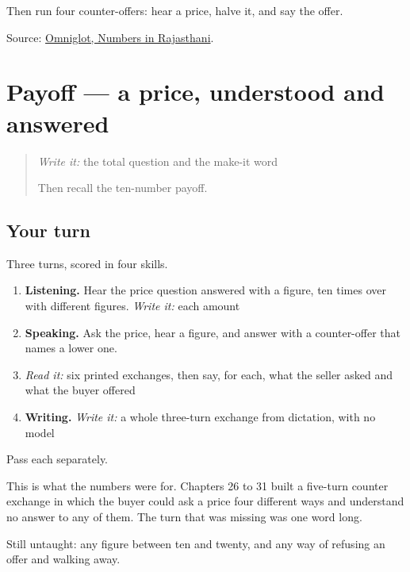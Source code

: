 Then run four counter-offers: hear a price, halve it, and say the offer.

\begin{tcolorbox}[breakable,colback=teal!4,colframe=teal!35!black,title={Before you move on}]
Source: \href{https://www.omniglot.com/language/numbers/rajasthani.htm}{Omniglot, Numbers in Rajasthani}.
\end{tcolorbox}
\section[Practice]{Payoff — a price, understood and answered}

\label{lesson:MW-C34-numbered-price}



\begin{quote}
\emph{Write it:} the total question and the make-it word

Then recall the ten-number payoff.
\end{quote}

\subsection*{Your turn}
Three turns, scored in four skills.

\begin{enumerate}
\raggedright
  \item \textbf{Listening.} Hear the price question answered with a figure, ten times over with different figures. \emph{Write it:} each amount
  \item \textbf{Speaking.} Ask the price, hear a figure, and answer with a counter-offer that names a lower one.
  \item \emph{Read it:} six printed exchanges, then say, for each, what the seller asked and what the buyer offered
  \item \textbf{Writing.} \emph{Write it:} a whole three-turn exchange from dictation, with no model
\end{enumerate}

Pass each separately.

This is what the numbers were for. Chapters 26 to 31 built a five-turn counter exchange in which the buyer could ask a price four different ways and understand no answer to any of them. The turn that was missing was one word long.

Still untaught: any figure between ten and twenty, and any way of refusing an offer and walking away.

